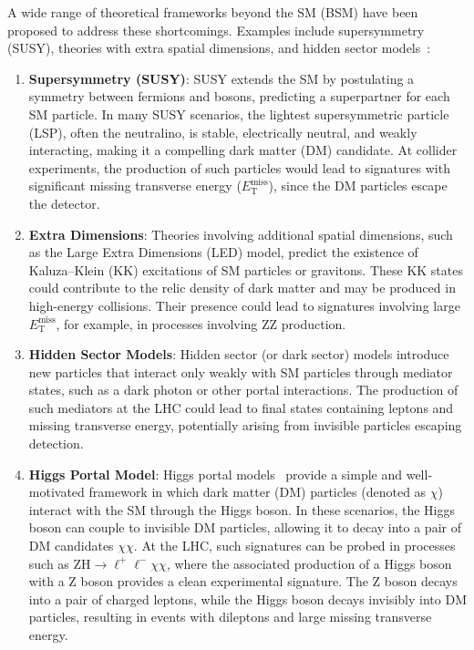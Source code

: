 A wide range of theoretical frameworks beyond the SM (BSM) have been proposed to address these shortcomings. Examples include supersymmetry (SUSY), theories with extra spatial dimensions, and hidden sector models~\cite{Strassler2007hv}:
\begin{enumerate}
    \item \textbf{Supersymmetry (SUSY)}: 
    SUSY extends the SM by postulating a symmetry between fermions and bosons, predicting a superpartner for each SM particle. In many SUSY scenarios, the lightest supersymmetric particle (LSP), often the neutralino, is stable, electrically neutral, and weakly interacting, making it a compelling dark matter (DM) candidate. At collider experiments, the production of such particles would lead to signatures with significant missing transverse energy (\(E_{\text{T}}^{\text{miss}}\)), since the DM particles escape the detector. 
    
    \item \textbf{Extra Dimensions}: 
    Theories involving additional spatial dimensions, such as the Large Extra Dimensions (LED) model, predict the existence of Kaluza--Klein (KK) excitations of SM particles or gravitons. These KK states could contribute to the relic density of dark matter and may be produced in high-energy collisions. Their presence could lead to signatures involving large \(E_{\text{T}}^{\text{miss}}\), for example, in processes involving \(\text{ZZ}\) production.

    \item \textbf{Hidden Sector Models}: 
    Hidden sector (or dark sector) models introduce new particles that interact only weakly with SM particles through mediator states, such as a dark photon or other portal interactions. The production of such mediators at the LHC could lead to final states containing leptons and missing transverse energy, potentially arising from invisible particles escaping detection.

    \item \textbf{Higgs Portal Model}: 
    Higgs portal models~\cite{McDonald1994} provide a simple and well-motivated framework in which dark matter (DM) particles (denoted as $\chi$) interact with the SM through the Higgs boson. In these scenarios, the Higgs boson can couple to invisible DM particles, allowing it to decay into a pair of DM candidates $\chi\chi$. At the LHC, such signatures can be probed in processes such as \(\text{ZH} \rightarrow \ell^+\ell^- \chi\chi\), where the associated production of a Higgs boson with a $\text{Z}$ boson provides a clean experimental signature. The $\text{Z}$ boson decays into a pair of charged leptons, while the Higgs boson decays invisibly into DM particles, resulting in events with dileptons and large missing transverse energy.
\end{enumerate}

